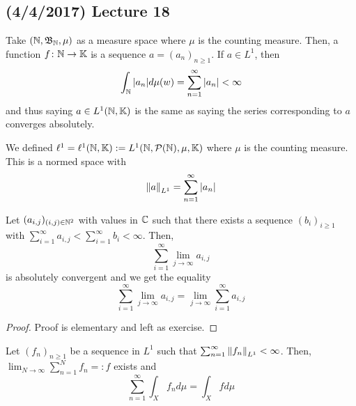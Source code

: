 \documentclass[11pt,leqno,oneside]{amsbook}
\numberwithin{thm}{section}
\renewcommand{\P}{\mathcal{P}}
\newcommand{\K}{\mathbb{K}} %
\begin{document}
\subsection*{(4/4/2017) Lecture 18}
\begin{example}
  Take \((\N,\B_\N,\mu)\) as a measure space where \(\mu\) is the
  counting measure. Then, a function \(f \from \N \to \K\) is a
  sequence \(a = (a_n)_{n \geq 1}\). If \(a \in L^1\), then \[
    \int_\N |a_n| d\mu(w) = \sum_{n=1}^\infty |a_n| < \infty
  \]
  and thus saying \(a \in L^1(\N,\K)\) is the same as saying the
  series corresponding to \(a\) converges absolutely.
\end{example}
\begin{defn}
  We defined \(\ell^1 = \ell^1(\N,\K) := L^1(\N,\P(\N),\mu,\K)\) where
  \(\mu\) is the counting measure. This is a normed space with \[
    \norm[a]_{L^1} = \sum_{n=1}^\infty |a_n|
  \]
\end{defn}
\begin{cor}
  Let \((a_{i,j})_{(i,j) \in \N^2}\) with values in \(\C\) such that
  there exists a sequence 
  \((b_i)_{i \geq 1}\) with \(\sum_{i=1}^\infty a_{i,j} <
  \sum_{i=1}^\infty b_i < \infty\).
  Then, \[
    \sum_{i=1}^\infty \lim_{j \to \infty} a_{i,j}
  \]
  is absolutely convergent and we get the equality \[
    \sum_{i=1}^\infty \lim_{j \to \infty} a_{i,j} = \lim_{j \to
      \infty} \sum_{i=1}^\infty a_{i,j}
  \]
\end{cor}
\begin{proof}
  Proof is elementary and left as exercise.
\end{proof}
\begin{thm}
  Let \((f_n)_{n \geq 1}\) be a sequence in \(L^1\) such that
  \(\sum_{n=1}^\infty \norm[f_n]_{L^1} < \infty\). Then, \(\lim_{N \to
  \infty} \sum_{n=1}^N f_n =: f\) exists
  and \[
    \sum_{n=1}^\infty \int_X f_n d\mu = \int_X f d\mu
  \]
\end{thm}
\end{document}
